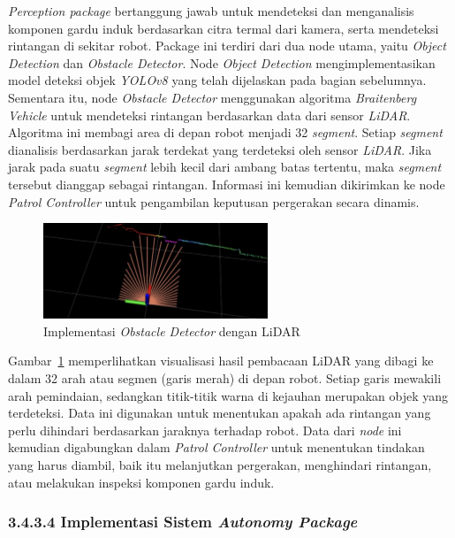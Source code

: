 \emph{Perception package} bertanggung jawab untuk mendeteksi dan menganalisis komponen gardu induk berdasarkan citra termal dari kamera, serta mendeteksi rintangan di sekitar robot. Package ini terdiri dari dua node utama, yaitu \emph{Object Detection} dan \emph{Obstacle Detector}. Node \emph{Object Detection} mengimplementasikan model deteksi objek \emph{YOLOv8} yang telah dijelaskan pada bagian sebelumnya. Sementara itu, node \emph{Obstacle Detector} menggunakan algoritma \emph{Braitenberg Vehicle} untuk mendeteksi rintangan berdasarkan data dari sensor \emph{LiDAR}. Algoritma ini membagi area di depan robot menjadi 32 \emph{segment}. Setiap \emph{segment} dianalisis berdasarkan jarak terdekat yang terdeteksi oleh sensor \emph{LiDAR}. Jika jarak pada suatu \emph{segment} lebih kecil dari ambang batas tertentu, maka \emph{segment} tersebut dianggap sebagai rintangan. Informasi ini kemudian dikirimkan ke node \emph{Patrol Controller} untuk pengambilan keputusan pergerakan secara dinamis.

\begin{figure}[H]
  \centering
  \includegraphics[width=0.6\textwidth]{gambar/bab3/obstacle_avoidance.png}
  \caption{Implementasi \emph{Obstacle Detector} dengan LiDAR}
  \label{fig:obstacle-detector}
\end{figure}

Gambar~\ref{fig:obstacle-detector} memperlihatkan visualisasi hasil pembacaan LiDAR yang dibagi ke dalam 32 arah atau segmen (garis merah) di depan robot. Setiap garis mewakili arah pemindaian, sedangkan titik-titik warna di kejauhan merupakan objek yang terdeteksi. Data ini digunakan untuk menentukan apakah ada rintangan yang perlu dihindari berdasarkan jaraknya terhadap robot. Data dari \emph{node} ini kemudian digabungkan dalam \emph{Patrol Controller} untuk menentukan tindakan yang harus diambil, baik itu melanjutkan pergerakan, menghindari rintangan, atau melakukan inspeksi komponen gardu induk. 


\subsubsection{3.4.3.4 Implementasi Sistem \emph{Autonomy Package}}

